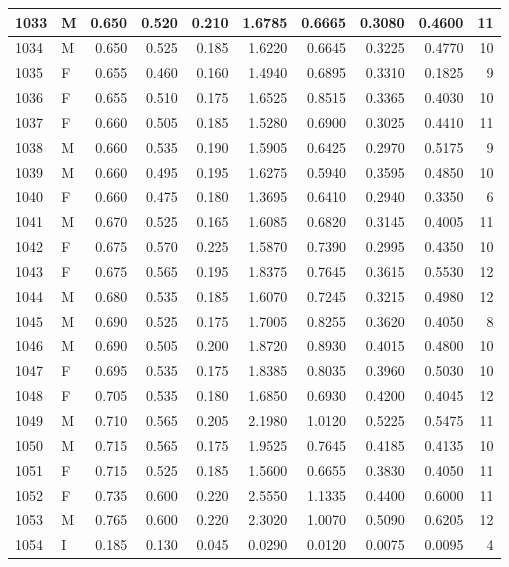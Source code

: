 \documentclass[9pt,twocolumn,twoside,]{pnas-new}
\begin{document}
\begin{tabular}{l|l|r|r|r|r|r|r|r|r}
\hline
1033 & M & 0.650 & 0.520 & 0.210 & 1.6785 & 0.6665 & 0.3080 & 0.4600 & 11\\
\hline
1034 & M & 0.650 & 0.525 & 0.185 & 1.6220 & 0.6645 & 0.3225 & 0.4770 & 10\\
\hline
1035 & F & 0.655 & 0.460 & 0.160 & 1.4940 & 0.6895 & 0.3310 & 0.1825 & 9\\
\hline
1036 & F & 0.655 & 0.510 & 0.175 & 1.6525 & 0.8515 & 0.3365 & 0.4030 & 10\\
\hline
1037 & F & 0.660 & 0.505 & 0.185 & 1.5280 & 0.6900 & 0.3025 & 0.4410 & 11\\
\hline
1038 & M & 0.660 & 0.535 & 0.190 & 1.5905 & 0.6425 & 0.2970 & 0.5175 & 9\\
\hline
1039 & M & 0.660 & 0.495 & 0.195 & 1.6275 & 0.5940 & 0.3595 & 0.4850 & 10\\
\hline
1040 & F & 0.660 & 0.475 & 0.180 & 1.3695 & 0.6410 & 0.2940 & 0.3350 & 6\\
\hline
1041 & M & 0.670 & 0.525 & 0.165 & 1.6085 & 0.6820 & 0.3145 & 0.4005 & 11\\
\hline
1042 & F & 0.675 & 0.570 & 0.225 & 1.5870 & 0.7390 & 0.2995 & 0.4350 & 10\\
\hline
1043 & F & 0.675 & 0.565 & 0.195 & 1.8375 & 0.7645 & 0.3615 & 0.5530 & 12\\
\hline
1044 & M & 0.680 & 0.535 & 0.185 & 1.6070 & 0.7245 & 0.3215 & 0.4980 & 12\\
\hline
1045 & M & 0.690 & 0.525 & 0.175 & 1.7005 & 0.8255 & 0.3620 & 0.4050 & 8\\
\hline
1046 & M & 0.690 & 0.505 & 0.200 & 1.8720 & 0.8930 & 0.4015 & 0.4800 & 10\\
\hline
1047 & F & 0.695 & 0.535 & 0.175 & 1.8385 & 0.8035 & 0.3960 & 0.5030 & 10\\
\hline
1048 & F & 0.705 & 0.535 & 0.180 & 1.6850 & 0.6930 & 0.4200 & 0.4045 & 12\\
\hline
1049 & M & 0.710 & 0.565 & 0.205 & 2.1980 & 1.0120 & 0.5225 & 0.5475 & 11\\
\hline
1050 & M & 0.715 & 0.565 & 0.175 & 1.9525 & 0.7645 & 0.4185 & 0.4135 & 10\\
\hline
1051 & F & 0.715 & 0.525 & 0.185 & 1.5600 & 0.6655 & 0.3830 & 0.4050 & 11\\
\hline
1052 & F & 0.735 & 0.600 & 0.220 & 2.5550 & 1.1335 & 0.4400 & 0.6000 & 11\\
\hline
1053 & M & 0.765 & 0.600 & 0.220 & 2.3020 & 1.0070 & 0.5090 & 0.6205 & 12\\
\hline
1054 & I & 0.185 & 0.130 & 0.045 & 0.0290 & 0.0120 & 0.0075 & 0.0095 & 4\\

\end{tabular}
\end{document}
